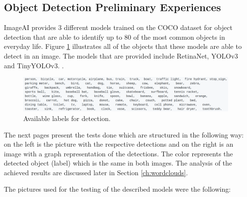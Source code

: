 
  \subsection{Object Detection Preliminary Experiences}
  \label{sec:object_test}

  ImageAI provides 3 different models trained on the COCO dataset for object detection that are able to identify up to 80 of the most common objects in everyday life. Figure \ref{fig:labels} illustrates all of the objects that these models are able to detect in an image. The models that are provided include RetinaNet, YOLOv3 and TinyYOLOv3. \cite{ImageAI}.
  

  

    \begin{figure}[H]
      \centering
      \includegraphics[width = \textwidth]{Sections/4InitialWork/4_images_random/detections.png}
      \caption{Available labels for detection. }
      \label{fig:labels} 
  \end{figure}

  The next pages present the tests done which are structured in the following way: on the left is the picture with the respective detections and on the right is an image with a graph representation of the detections. The color represents the detected object (label) which is the same in both images. The analysis of the achieved results are discussed later in Section \ref{ch:wordclouds}.

  The pictures used for the testing of the described models were the following:

